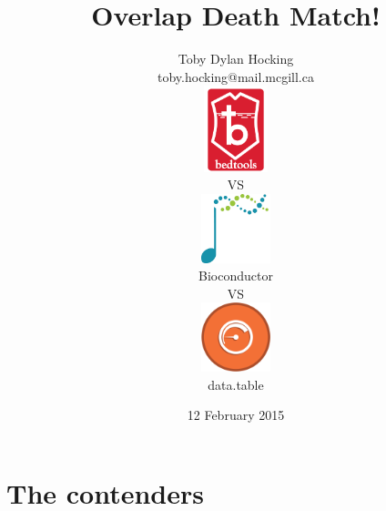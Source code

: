 \documentclass{beamer}
\begin{document}
\title{Overlap Death Match!}

\author{
  Toby Dylan Hocking\\
  toby.hocking@mail.mcgill.ca
\vskip 0.5cm
\parbox{2cm}{
  \includegraphics[height=2.5cm]{bedtools} 
}
VS 
\parbox{2cm}{
  \centering
  \includegraphics[height=2cm]{bioconductor}
  \\
  Bioconductor
}
VS
\parbox{2cm}{
  \centering
  \includegraphics[height=2cm]{datatable} 
  \\
  data.table
}
}

\date{12 February 2015}

\maketitle


\section{The contenders}
\end{document}
